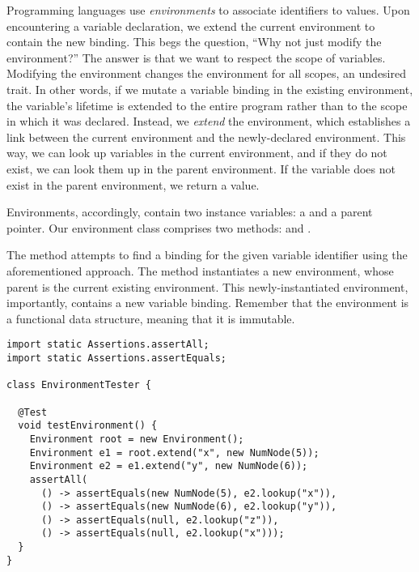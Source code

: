 Programming languages use \emph{environments} to associate identifiers to values. 
Upon encountering a variable declaration, we extend the current environment to contain the new binding. 
This begs the question, ``Why not just modify the environment?'' 
The answer is that we want to respect the scope of variables. 
Modifying the environment changes the environment for all scopes, an undesired trait. 
In other words, if we mutate a variable binding in the existing environment, the variable's lifetime is extended to the entire program rather than to the scope in which it was declared.
Instead, we \emph{extend} the environment, which establishes a link between the current environment and the newly-declared environment. 
This way, we can look up variables in the current environment, and if they do not exist, we can look them up in the parent environment. 
If the variable does not exist in the parent environment, we return a  value.

Environments, accordingly, contain two instance variables: a  and a  parent pointer. Our environment class comprises two methods:  and . 

The  method attempts to find a binding for the given variable identifier using the aforementioned approach. The  method instantiates a new environment, whose parent is the current existing environment. This newly-instantiated environment, importantly, contains a new variable binding. Remember that the environment is a functional data structure, meaning that it is immutable.

\begin{lstlisting}[language=MyJava]
import static Assertions.assertAll;
import static Assertions.assertEquals;

class EnvironmentTester {
  
  @Test
  void testEnvironment() {
    Environment root = new Environment();
    Environment e1 = root.extend("x", new NumNode(5));
    Environment e2 = e1.extend("y", new NumNode(6));
    assertAll(
      () -> assertEquals(new NumNode(5), e2.lookup("x")),
      () -> assertEquals(new NumNode(6), e2.lookup("y")),
      () -> assertEquals(null, e2.lookup("z")),
      () -> assertEquals(null, e2.lookup("x")));
  }
}
\end{lstlisting}

